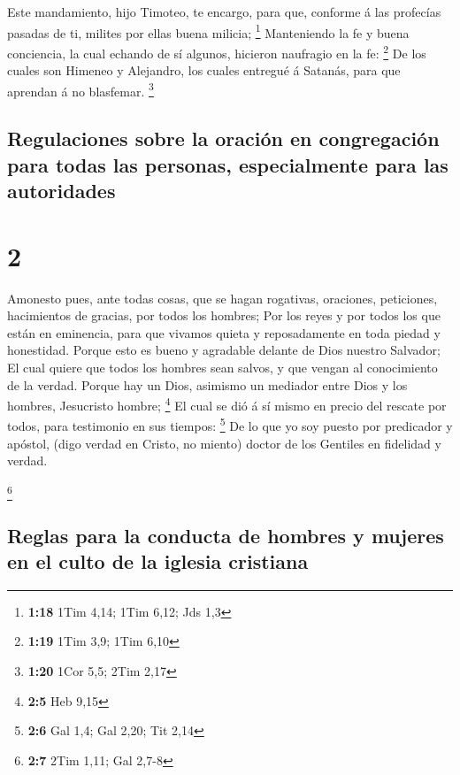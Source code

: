  Este mandamiento, hijo Timoteo, te encargo, para que,
conforme á las profecías pasadas de ti, milites por ellas buena milicia;
\footnote{\textbf{1:18} 1Tim 4,14; 1Tim 6,12; Jds 1,3} 
Manteniendo la fe y buena conciencia, la cual echando de sí algunos,
hicieron naufragio en la fe: \footnote{\textbf{1:19} 1Tim 3,9; 1Tim 6,10}
 De los cuales son Himeneo y Alejandro, los cuales
entregué á Satanás, para que aprendan á no blasfemar. \footnote{\textbf{1:20}
  1Cor 5,5; 2Tim 2,17}

\hypertarget{regulaciones-sobre-la-oraciuxf3n-en-congregaciuxf3n-para-todas-las-personas-especialmente-para-las-autoridades}{%
\subsection{Regulaciones sobre la oración en congregación para todas las
personas, especialmente para las
autoridades}\label{regulaciones-sobre-la-oraciuxf3n-en-congregaciuxf3n-para-todas-las-personas-especialmente-para-las-autoridades}}

\hypertarget{section-1}{%
\section{2}\label{section-1}}

 Amonesto pues, ante todas cosas, que se hagan rogativas,
oraciones, peticiones, hacimientos de gracias, por todos los hombres;
 Por los reyes y por todos los que están en eminencia,
para que vivamos quieta y reposadamente en toda piedad y honestidad.
 Porque esto es bueno y agradable delante de Dios nuestro
Salvador;  El cual quiere que todos los hombres sean
salvos, y que vengan al conocimiento de la verdad.  Porque
hay un Dios, asimismo un mediador entre Dios y los hombres, Jesucristo
hombre; \footnote{\textbf{2:5} Heb 9,15}  El cual se dió á
sí mismo en precio del rescate por todos, para testimonio en sus
tiempos: \footnote{\textbf{2:6} Gal 1,4; Gal 2,20; Tit 2,14}
 De lo que yo soy puesto por predicador y apóstol, (digo
verdad en Cristo, no miento) doctor de los Gentiles en fidelidad y
verdad.

\footnote{\textbf{2:7} 2Tim 1,11; Gal 2,7-8}

\hypertarget{reglas-para-la-conducta-de-hombres-y-mujeres-en-el-culto-de-la-iglesia-cristiana}{%
\subsection{Reglas para la conducta de hombres y mujeres en el culto de
la iglesia
cristiana}\label{reglas-para-la-conducta-de-hombres-y-mujeres-en-el-culto-de-la-iglesia-cristiana}}

